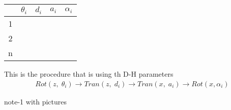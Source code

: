 \documentclass[12pt, a4paper]{extarticle}
\begin{document}
\begin{enumerate}
			\begin{minipage}{\textwidth}
				\begin{tabular}{|c|c|c|c|c|}
					\hline
					& $\theta_i$ & $d_i$ & $a_i$ & $\alpha_i$\\
					\hline
					1 &  & & & \\
					\hline
					2 &  & & & \\
					\hline
					n &  & & & \\
					\hline
				\end{tabular}
				This is the procedure that is using th D-H parameters
				\begin{align}\label{key}
					Rot(z,\;\theta_i)  \rightarrow Tran(z,\; d_i) \rightarrow Tran(x,\; a_i) \rightarrow Rot(x, \alpha_i)
				\end{align}
			\end{minipage}


	\end{enumerate}
	note-1 with pictures





 
\end{document}
